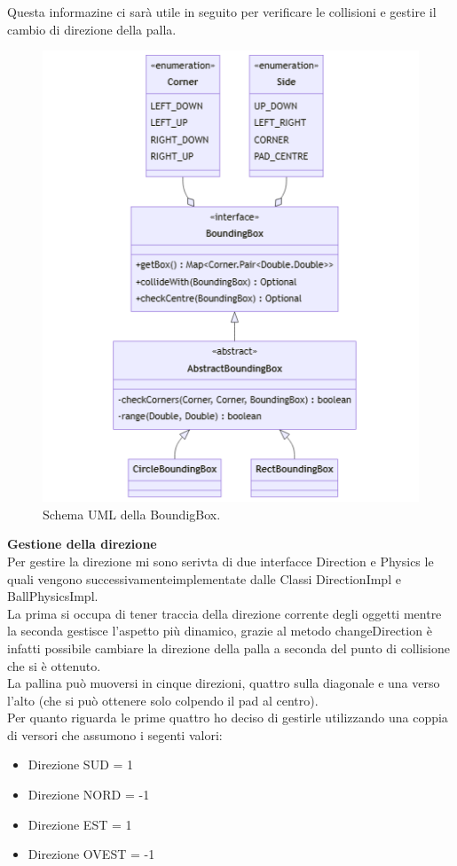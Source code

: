 \documentclass[a4paper,12pt]{report}
\begin{document}
Questa informazine ci sarà utile in seguito per verificare le collisioni e gestire il cambio di direzione della palla.
\begin{figure}[H]
    \centering{}
    \includegraphics[scale=0.6]{images/BoundingBox.png}
    \caption{Schema UML della BoundigBox.}
    \label{images:BoundigBox}
\end{figure}
\textbf{Gestione della direzione}\\
Per gestire la direzione mi sono serivta di due interfacce Direction e Physics le quali vengono successivamenteimplementate dalle Classi DirectionImpl e BallPhysicsImpl.
\\La prima si occupa di tener traccia della direzione corrente degli oggetti mentre la seconda gestisce l'aspetto più dinamico, grazie al metodo changeDirection è infatti possibile cambiare la direzione della palla a seconda del punto di collisione che si è ottenuto.
\\ La pallina può muoversi in cinque direzioni, quattro sulla diagonale e una verso l'alto (che si può ottenere solo colpendo il pad al centro).
\\Per quanto riguarda le prime quattro ho deciso di gestirle utilizzando una coppia di versori che assumono i segenti valori:
\begin{itemize}
    \item  Direzione SUD = 1
    \item  Direzione NORD = -1
    \item  Direzione EST = 1
    \item  Direzione OVEST = -1

\end{itemize}
\end{document}
